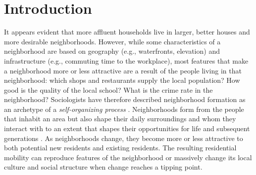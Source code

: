 \section{Introduction}

It appears evident that more affluent households live in larger, better houses and more desirable neighborhoods. However, while some characteristics of a neighborhood are based on geography (e.g., waterfronts, elevation) and infrastructure (e.g., commuting time to the workplace), most features that make a neighborhood more or less attractive are a result of the people living in that neighborhood: which shops and restaurants supply the local population? How good is the quality of the local school? What is the crime rate in the neighborhood? Sociologists have therefore described neighborhood formation as an archetype of a \textit{self-organizing process} \citep{schellingDynamicModelsSegregation1971, galsterNatureNeighbourhood2001, fossettEthnicPreferencesSocial2006}. Neighborhoods form from the people that inhabit an area but also shape their daily surroundings and whom they interact with to an extent that shapes their opportunities for life \citep{sampsonAssessingNeighborhoodEffects2002, sharkeyWhereWhenWhy2014, chettyImpactsNeighborhoodsIntergenerational2018a} and subsequent generations \citep{sharkeyIntergenerationalTransmissionContext2008}. As neighborhoods change, they become more or less attractive to both potential new residents and existing residents. The resulting residential mobility can reproduce features of the neighborhood or massively change its local culture and social structure when change reaches a tipping point.

